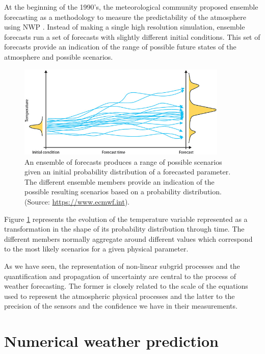 \medskip

At the beginning of the 1990's, the meteorological community proposed ensemble forecasting as a methodology to measure the predictability of the atmosphere using NWP \citep{molteni1996ecmwf}. Instead of making a single high resolution simulation, ensemble forecasts run a set of forecasts with slightly different initial conditions. This set of forecasts provide an indication of the range of possible future states of the atmosphere and possible scenarios. 

\medskip

\begin{figure}[h]
 \centerline{\includegraphics[width=10cm]{ensemble-forecasting.jpg}} \caption{An ensemble of forecasts produces a range of possible scenarios given an initial probability distribution of a forecasted parameter. The different ensemble members provide an indication of the possible resulting scenarios based on a probability distribution. (Source: \url{https://www.ecmwf.int}).}\label{ensemble}
\end{figure}

Figure \ref{ensemble} represents the evolution of the temperature variable represented as a transformation in the shape of its probability distribution through time. The different members normally aggregate around different values which correspond to the most likely scenarios for a given physical parameter.

\medskip

As we have seen, the representation of non-linear subgrid processes and the quantification and propagation of uncertainty are central to the process of weather forecasting. The former is closely related to the scale of the equations used to represent the atmospheric physical processes and the latter to the precision of the sensors and the confidence we have in their measurements.



\section{Numerical weather prediction}

